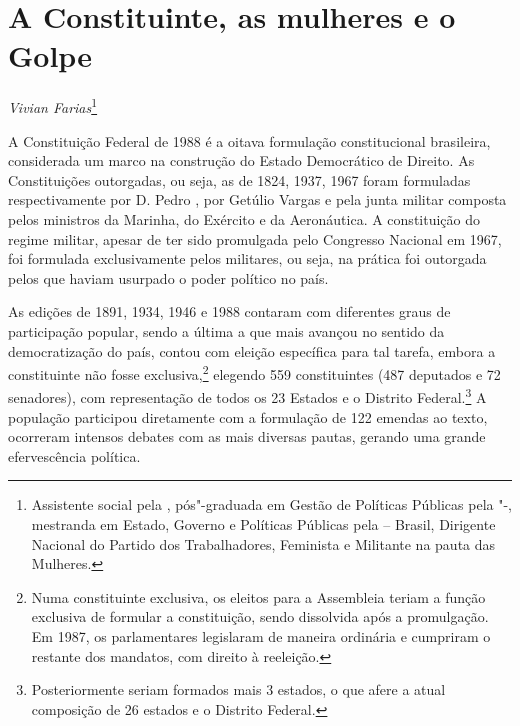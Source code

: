 \chapter*{A Constituinte, as mulheres e o Golpe}


\begin{flushright}
\emph{Vivian Farias}\footnote{Assistente social pela , pós"-graduada em
  Gestão de Políticas Públicas pela "-, mestranda em Estado,
  Governo e Políticas Públicas pela  -- Brasil, Dirigente Nacional
  do Partido dos Trabalhadores, Feminista e Militante na pauta das
  Mulheres.}
\end{flushright}

A Constituição Federal de 1988 é a oitava formulação constitucional
brasileira, considerada um marco na construção do Estado Democrático de
Direito. As Constituições outorgadas, ou seja, as de 1824, 1937, 1967
foram formuladas respectivamente por D. Pedro , por Getúlio Vargas e
pela junta militar composta pelos ministros da Marinha, do Exército e da
Aeronáutica. A constituição do regime militar, apesar de ter sido
promulgada pelo Congresso Nacional em 1967, foi formulada exclusivamente
pelos militares, ou seja, na prática foi outorgada pelos que haviam
usurpado o poder político no país.

As edições de 1891, 1934, 1946 e 1988 contaram com diferentes graus de
participação popular, sendo a última a que mais avançou no sentido da
democratização do país, contou com eleição específica para tal tarefa,
embora a constituinte não fosse exclusiva,\footnote{Numa constituinte
  exclusiva, os eleitos para a Assembleia teriam a função exclusiva de
  formular a constituição, sendo dissolvida após a promulgação. Em 1987,
  os parlamentares legislaram de maneira ordinária e cumpriram o
  restante dos mandatos, com direito à reeleição.} elegendo 559
constituintes (487 deputados e 72 senadores), com representação de todos
os 23 Estados e o Distrito Federal.\footnote{Posteriormente seriam
  formados mais 3 estados, o que afere a atual composição de 26 estados
  e o Distrito Federal.} A população participou diretamente com a
formulação de 122 emendas ao texto, ocorreram intensos debates com as
mais diversas pautas, gerando uma grande efervescência política.

